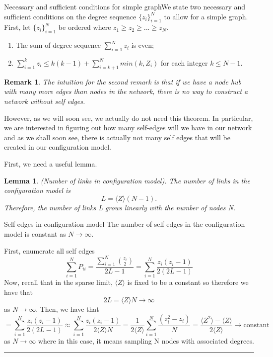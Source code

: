 \documentclass[twoside]{article}
\newtheorem{lemma}[theorem]{Lemma}
\newtheorem{remark}[theorem]{Remark}
\newenvironment{proof}{{\bf Proof:}}{\hfill\rule{2mm}{2mm}}
\begin{document}
\begin{theorem_exam}{Necessary and sufficient conditions for simple graph}{}We state two necessary and sufficient conditions on the degree sequence $\{z_i\}_{i=1}^{N}$ to allow for a simple graph. First, let $\{z_i\}_{i=1}^{N}$ be ordered where $z_1 \geq z_2 \geq ... \geq z_N.$
\begin{enumerate}
\item The sum of degree sequence $\sum_{i=1}^{N}z_i$ is even;
\item $\sum_{i=1}^{k}z_i \leq k(k - 1) + \sum_{i=k+1}^{N}min(k,Z_i)$ for each integer $k \leq N - 1.$
\end{enumerate}
\end{theorem_exam}

\begin{remark} The intuition for the second remark is that if we have a node hub with many more edges than nodes in the network, there is no way to construct a network without self edges.
\end{remark}

However, as we will soon see, we actually do not need this theorem. In particular, we are interested in figuring out how many self-edges will we have in our network and as we shall soon see, there is actually not many self edges that will be created in our configuration model.

First, we need a useful lemma.
\begin{lemma}(Number of links in configuration model). The number of links in the configuration model is 
$$
L = \langle Z \rangle (N - 1).
$$
Therefore, the number of links L grows linearly with the number of nodes N.
\end{lemma}

\begin{theorem_exam}{Self edges in configuration model}{} The number of self edges in the configuration model is constant as $N \rightarrow \infty.$
\end{theorem_exam}
\begin{proof} First, enumerate all self edges 
$$
\sum_{i=1}^{N}P_{ii} = \frac{\sum_{i=1}^{N} {z_i \choose 2} }{2L - 1} = \sum_{i=1}^{N}\frac{z_i(z_i - 1)}{2(2L - 1)}
$$
Now, recall that in the sparse limit, $\langle Z \rangle$ is fixed to be a constant so therefore we have that 
$$
2L = \langle Z \rangle N \rightarrow \infty
$$
as $N \rightarrow \infty.$ Then, we have that 
$$
= \sum_{i=1}^{N}\frac{z_i(z_i - 1)}{2(2L - 1)} \approx \sum_{i=1}^{N}\frac{z_i(z_i - 1)}{2 \langle Z \rangle N} = \frac{1}{2 \langle Z \rangle}\sum_{i=1}^{N}\frac{(z_i^2 - z_i)}{N} = \frac{\langle Z^2 \rangle - \langle Z \rangle}{2 \langle Z \rangle} \rightarrow \text{constant}
$$
as $N \rightarrow \infty$ where in this case, it means sampling N nodes with associated degrees.
\end{proof}
\end{document}
